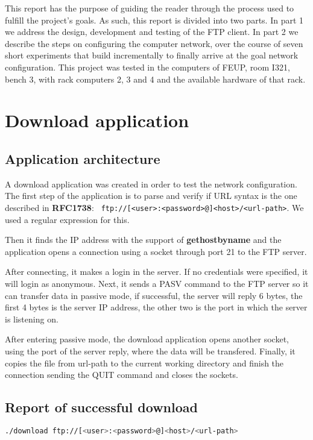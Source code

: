 \documentclass[a4paper, 11pt]{report}
\begin{document}
This report has the purpose of guiding the reader through the process used to fulfill the project's goals. As such, this report is divided into two parts.
In part 1 we address the design, development and testing of the FTP client.
In part 2 we describe the steps on configuring the computer network, over the course of seven short experiments that build incrementally to finally arrive at the goal network configuration.
This project was tested in the computers of FEUP, room I321, bench 3, with rack computers 2, 3 and 4 and the available hardware of that rack.

\section{Download application} \label{sec:Part1}
\subsection{Application architecture} \label{sec:Arc}

A download application was created in order to test the network configuration.
The first step of the application is to parse and verify if URL syntax is the one described in \textbf{RFC1738}: \texttt{ ftp://[<user>:<password>@]<host>/<url-path>}. We used a regular expression for this.

Then it finds the IP address with the support of \textbf{gethostbyname} and the application opens a connection using a socket through port 21 to the FTP server. 

After connecting, it makes a login in the server. If no credentials were specified, it will login as anonymous.
Next, it sends a PASV command to the FTP server so it can transfer data in passive mode, if successful, the server will reply
6 bytes, the first 4 bytes is the server IP address, the other two is the port in which the server is listening on. 

After entering passive mode, the download application opens another socket, using the port of the server reply, where the data will be transfered.
Finally, it copies the file from url-path to the current working directory and finish the connection sending the QUIT command and closes the sockets.


\subsection{Report of successful download} \label{sec:Dow}

\begin{lstlisting}[frame=none, numbers=none, language=sh]
./download ftp://[<user>:<password>@]<host>/<url-path>
\end{lstlisting}
\end{document}
